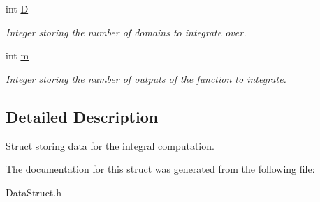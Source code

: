 \begin{DoxyCompactItemize}
\mbox{\label{struct_data_afe887f8ffbf8e145e0277093134cabcc}} 
int \hyperlink{struct_data_afe887f8ffbf8e145e0277093134cabcc}{D}
\begin{DoxyCompactList}\small\item\em Integer storing the number of domains to integrate over. \end{DoxyCompactList}\item 
\mbox{\label{struct_data_ab256a1176f3ba99a220c648b0c855840}} 
int \hyperlink{struct_data_ab256a1176f3ba99a220c648b0c855840}{m}
\begin{DoxyCompactList}\small\item\em Integer storing the number of outputs of the function to integrate. \end{DoxyCompactList}\end{DoxyCompactItemize}


\subsection{Detailed Description}
Struct storing data for the integral computation. 

The documentation for this struct was generated from the following file\+:\begin{DoxyCompactItemize}
\item 
Data\+Struct.\+h\end{DoxyCompactItemize}
